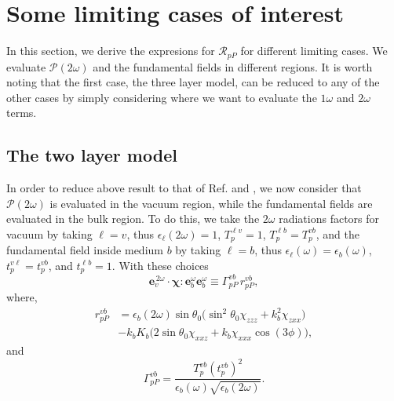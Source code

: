 
\section{Some limiting cases of interest}\label{app:limiting_cases}

In this section, we derive the expresions for $\mathcal{R}_{pP}$ for different
limiting cases. We evaluate $\mathcal{P}(2\omega)$ and the fundamental fields in
different regions. It is worth noting that the first case, the three layer
model, can be reduced to any of the other cases by simply considering where we
want to evaluate the $1\omega$ and $2\omega$ terms.


\subsection{The two layer model}

In order to reduce above result to that of Ref. \cite{mizrahiJOSA88} and
\cite{sipePRB87}, we now consider that $\mathcal{P}(2\omega)$ is evaluated in
the vacuum region, while the fundamental fields are evaluated in the bulk
region. To do this, we take the $2\omega$ radiations factors for vacuum by
taking $\ell=v$, thus $\epsilon_{\ell}(2\omega)=1$, $T^{\ell v}_{p}=1$, $T^{\ell
b}_{p}=T^{vb}_{p}$, and the fundamental field inside medium $b$ by taking
$\ell=b$, thus $\epsilon_{\ell}(\omega)=\epsilon_{b}(\omega)$,
$t^{v\ell}_{p}=t^{vb}_{p}$, and $t^{\ell b}_{p}=1$. With these choices
\begin{equation*}\label{m800}
\mathbf{e}^{\,2\omega}_{v}\cdot\boldsymbol{\chi}:
\mathbf{e}^\omega_{b}\mathbf{e}^\omega_{b}
\equiv\Gamma^{vb}_{pP}\,r^{vb}_{pP}
,
\end{equation*}
where,
\begin{equation*}\label{m82}
\begin{split}
r^{vb}_{pP}
&= \epsilon_{b}(2\omega)\sin\theta_{0}
\Big(
\sin^2\theta_{0}\chi_{zzz} + k^{2}_{b}\chi_{zxx}
\Big)\\
&- k_{b}K_{b}
\Big(
2\sin\theta_{0}\chi_{xxz} + k_{b}\chi_{xxx}\cos(3\phi) 
\Big) 
,
\end{split}
\end{equation*}
and 
\begin{equation*}\label{m78}
\Gamma^{vb}_{pP}
= \frac{T^{v b}_{p}(t^{vb}_{p})^2}
       {\epsilon_{b}(\omega)\sqrt{\epsilon_{b}(2\omega)}}.
\end{equation*}


